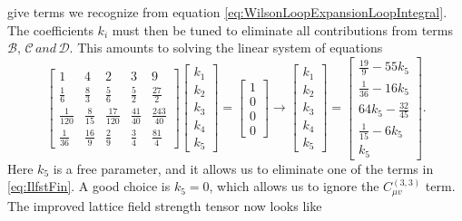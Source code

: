 \documentclass[a4paper,10pt]{book}
\begin{document}
give terms we recognize from equation \eqref{eq:WilsonLoopExpansionLoopIntegral}.
The coefficients $k_i$ must then be tuned to eliminate all contributions from terms $\mathscr{B},\,\mathscr{C}\,and\,\mathscr{D}$. This amounts to solving the linear system of equations 
\begin{equation}
\left[\begin{array}{ccccc}
1 & 4 & 2 & 3 & 9 \\
\frac{1}{6} & \frac{8}{3} & \frac{5}{6} & \frac{5}{2} & \frac{27}{2} \\
\frac{1}{120} & \frac{8}{15} & \frac{17}{120} & \frac{41}{40} & \frac{243}{40} \\
\frac{1}{36} & \frac{16}{9} & \frac{2}{9} & \frac{3}{4} & \frac{81}{4}
\end{array}\right]\left[\begin{array}{l}
k_{1} \\
k_{2} \\
k_{3} \\
k_{4} \\
k_{5}
\end{array}\right]=\left[\begin{array}{c}
1 \\
0 \\
0 \\
0
\end{array}\right] \rightarrow \left[\begin{array}{l}
k_{1} \\
k_{2} \\
k_{3} \\
k_{4} \\
k_{5}
\end{array}\right] = \left[\begin{array}{l}
\frac{19}{9}-55 k_{5} \\
\frac{1}{36}-16 k_{5} \\
64 k_{5}-\frac{32}{45} \\
\frac{1}{15}-6 k_{5} \\
k_{5}
\end{array}\right].
\end{equation}
Here $k_{5}$ is a free parameter, and it allows us to eliminate one of the terms in \eqref{eq:IlfstFin}. A good choice is $k_{5} = 0$, which allows us to ignore the $C_{\mu v}^{(3,3)}$ term. The improved lattice field strength tensor now looks like  
\end{document}
